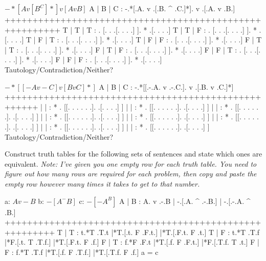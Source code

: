 $ -*[A v [B ^ C]*] v [A v B] $
        \answer
        \truthtable
         A | B | C : -.*[.A. v .[.B. ^ .C.]*].  v  .[.A. v .B.]
        ++++++++++++++++++++++++++++++++++++++++++++++++++++++++
         T | T | T :  . [. .   .[. .   . .] ]. *   .[. .   . .]
         T | T | F :  . [. .   .[. .   . .] ]. *   .[. .   . .]
         T | F | T :  . [. .   .[. .   . .] ]. *   .[. .   . .]
         T | F | F :  . [. .   .[. .   . .] ]. *   .[. .   . .]
         F | T | T :  . [. .   .[. .   . .] ]. *   .[. .   . .]
         F | T | F :  . [. .   .[. .   . .] ]. *   .[. .   . .]
         F | F | T :  . [. .   .[. .   . .] ]. *   .[. .   . .]
         F | F | F :  . [. .   .[. .   . .] ]. *   .[. .   . .]
        \endtruthtable
        Tautology/Contradiction/Neither?
        \endanswer

$ -*[[-A v -C] v [B v C]*] $
        \answer
        \truthtable
         A | B | C :  -.*[[.-.A. v .-.C.]. v .[.B. v .C.]*]
        ++++++++++++++++++++++++++++++++++++++++++++++++++++
           |   |   : * . [[. . .   . . .].   .[. .   . .] ]
           |   |   : * . [[. . .   . . .].   .[. .   . .] ]
           |   |   : * . [[. . .   . . .].   .[. .   . .] ]
           |   |   : * . [[. . .   . . .].   .[. .   . .] ]
           |   |   : * . [[. . .   . . .].   .[. .   . .] ]
           |   |   : * . [[. . .   . . .].   .[. .   . .] ]
           |   |   : * . [[. . .   . . .].   .[. .   . .] ]
           |   |   : * . [[. . .   . . .].   .[. .   . .] ]
        \endtruthtable
        Tautology/Contradiction/Neither?
        \endanswer

\endproblems

Construct truth tables for the following sets of sentences and state which ones are equivalent. {\it Note: I've given you one empty row for each truth table. You need to figure out how many rows are required for each problem, then copy and paste the empty row however many times it takes to get to that number.}

\problems
{}
\list
a: $ A v -B $
b: $ -[A ^ -B] $
c: $ -[-A ^ B] $
\endlist
        \answer
        \truthtable
         A | B : A. v .-.B | -.[.A. ^ .-.B.] | -.[.-.A. ^ .B.]
        +++++++++++++++++++++++++++++++++++++++++++++++++++++++
         T | T : t.*T .T.t |*T.[.t. F .F.t.] |*T.[.F.t. F .t.]
         T | F : t.*T .T.f |*F.[.t. T .T.f.] |*T.[.F.t. F .f.]
         F | T : f.*F .F.t |*T.[.f. F .F.t.] |*F.[.T.f. T .t.]
         F | F : f.*T .T.f |*T.[.f. F .T.f.] |*T.[.T.f. F .f.]
        \endtruthtable
        a = c
        \endanswer

